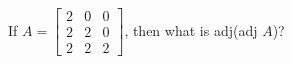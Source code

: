 
%
%
%
%
% 
% 

\question If $A = \left[ 
  \begin{array}{ccc}
    2 & 0 & 0 \\
    2 & 2 & 0 \\
    2 & 2 & 2
  \end{array}
\right]$, then what is adj(adj $A$)?

\insertQR{}

\ifprintanswers
\fi 

